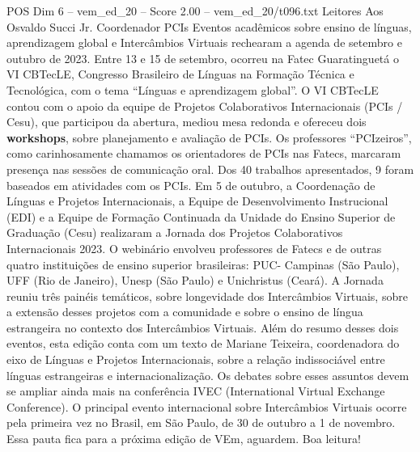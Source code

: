 \begin{textsample}{POS Dim 6 – vem\_ed\_20 – Score 2.00 – vem\_ed\_20/t096.txt}  \label{ex:f6_pos_030}
Leitores Aos Osvaldo Succi Jr.
Coordenador PCIs Eventos acadêmicos sobre ensino de línguas, aprendizagem global e Intercâmbios Virtuais rechearam a agenda de setembro e outubro de 2023.
Entre 13 e 15 de setembro, ocorreu na Fatec Guaratinguetá o VI CBTecLE, Congresso Brasileiro de Línguas na Formação Técnica e Tecnológica, com o tema “Línguas e aprendizagem global”.
O VI CBTecLE contou com o apoio da equipe de Projetos Colaborativos Internacionais (PCIs / Cesu), que participou da abertura, mediou mesa redonda e ofereceu dois \textbf{workshops}, sobre planejamento e avaliação de PCIs.
Os professores “PCIzeiros”, como carinhosamente chamamos os orientadores de PCIs nas Fatecs, marcaram presença nas sessões de comunicação oral.
Dos 40 trabalhos apresentados, 9 foram baseados em atividades com os PCIs.
Em 5 de outubro, a Coordenação de Línguas e Projetos Internacionais, a Equipe de Desenvolvimento Instrucional (EDI) e a Equipe de Formação Continuada da Unidade do Ensino Superior de Graduação (Cesu) realizaram a Jornada dos Projetos Colaborativos Internacionais 2023.
O webinário envolveu professores de Fatecs e de outras quatro instituições de ensino superior brasileiras: PUC- Campinas (São Paulo), UFF (Rio de Janeiro), Unesp (São Paulo) e Unichristus (Ceará).
A Jornada reuniu três painéis temáticos, sobre longevidade dos Intercâmbios Virtuais, sobre a extensão desses projetos com a comunidade e sobre o ensino de língua estrangeira no contexto dos Intercâmbios Virtuais.
Além do resumo desses dois eventos, esta edição conta com um texto de Mariane Teixeira, coordenadora do eixo de Línguas e Projetos Internacionais, sobre a relação indissociável entre línguas estrangeiras e internacionalização.
Os debates sobre esses assuntos devem se ampliar ainda mais na conferência IVEC (International Virtual Exchange Conference).
O principal evento internacional sobre Intercâmbios Virtuais ocorre pela primeira vez no Brasil, em São Paulo, de 30 de outubro a 1 de novembro.
Essa pauta fica para a próxima edição de VEm, aguardem.
Boa leitura!

\end{textsample}
